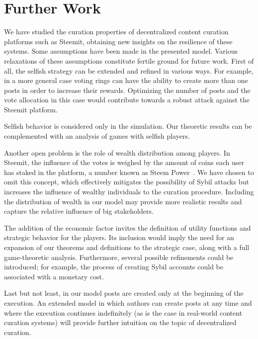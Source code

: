 \section{Further Work}

  We have studied the curation properties of decentralized content curation
  platforms such as Steemit, obtaining new insights on the resilience of these
  systems. Some assumptions have been made in the presented model. Various
  relaxations of these assumptions constitute fertile ground for future work.
  First of all, the selfish strategy can be extended and refined in various
  ways. For example, in a more general case voting rings can have the ability to
  create more than one posts in order to increase their rewards. Optimizing the
  number of posts and the vote allocation in this case would contribute towards
  a robust attack against the Steemit platform.

  Selfish behavior is considered only in the simulation. Our theoretic results
  can be complemented with an analysis of games with selfish players.

  Another open problem is the role of wealth distribution among players. In
  Steemit, the influence of the votes is weighed by the amount of coins each
  user has staked in the platform, a number known as Steem Power~\cite{steemit}.
  We have chosen to omit this concept, which effectively mitigates the
  possibility of Sybil attacks but increases the influence of wealthy
  individuals to the curation procedure. Including the distribution of wealth in
  our model may provide more realistic results and capture the relative
  influence of big stakeholders.

  The addition of the economic factor invites the definition of utility
  functions and strategic behavior for the players. Its inclusion would imply
  the need for an expansion of our theorems and definitions to the strategic
  case, along with a full game-theoretic analysis. Furthermore, several possible
  refinements could be introduced; for example, the process of creating Sybil
  accounts could be associated with a monetary cost.

  Last but not least, in our model posts are created only at the beginning of
  the execution. An extended model in which authors can create posts at any time
  and where the execution continues indefinitely (as is the case in real-world
  content curation systems) will provide further intuition on the topic of
  decentralized curation.
